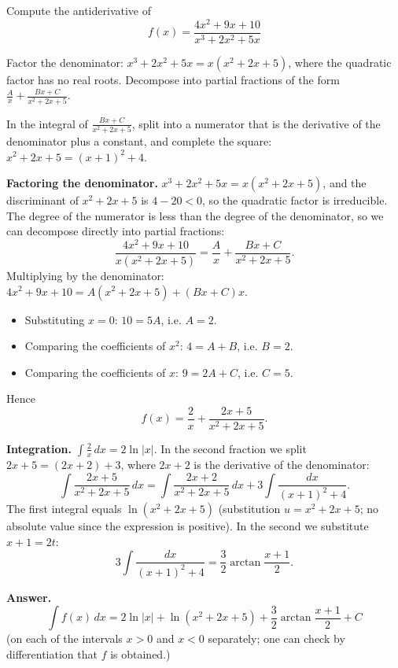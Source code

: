 
\begin{question}
Compute the antiderivative of
\[ f(x)=\frac{4x^2+9x+10}{x^3+2x^2+5x} \]
\end{question}

\begin{hint}
Factor the denominator: $x^3+2x^2+5x=x(x^2+2x+5)$, where the quadratic factor has no real roots. Decompose into partial fractions of the form $\frac{A}{x}+\frac{Bx+C}{x^2+2x+5}$.
\end{hint}

\begin{hint}
In the integral of $\frac{Bx+C}{x^2+2x+5}$, split into a numerator that is the derivative of the denominator plus a constant, and complete the square: $x^2+2x+5=(x+1)^2+4$.
\end{hint}

\begin{solution}
\textbf{Factoring the denominator.} $x^3+2x^2+5x=x(x^2+2x+5)$, and the discriminant of $x^2+2x+5$ is $4-20<0$, so the quadratic factor is irreducible. The degree of the numerator is less than the degree of the denominator, so we can decompose directly into partial fractions:
\[ \frac{4x^2+9x+10}{x(x^2+2x+5)}=\frac{A}{x}+\frac{Bx+C}{x^2+2x+5}. \]
Multiplying by the denominator: $4x^2+9x+10=A(x^2+2x+5)+(Bx+C)x$.
\begin{itemize}
  \item Substituting $x=0$: $10=5A$, i.e. $A=2$.
  \item Comparing the coefficients of $x^2$: $4=A+B$, i.e. $B=2$.
  \item Comparing the coefficients of $x$: $9=2A+C$, i.e. $C=5$.
\end{itemize}
Hence
\[ f(x)=\frac{2}{x}+\frac{2x+5}{x^2+2x+5}. \]

\textbf{Integration.} $\int\frac{2}{x}\,dx=2\ln|x|$. In the second fraction we split $2x+5=(2x+2)+3$, where $2x+2$ is the derivative of the denominator:
\[ \int\frac{2x+5}{x^2+2x+5}\,dx=\int\frac{2x+2}{x^2+2x+5}\,dx+3\int\frac{dx}{(x+1)^2+4}. \]
The first integral equals $\ln(x^2+2x+5)$ (substitution $u=x^2+2x+5$; no absolute value since the expression is positive). In the second we substitute $x+1=2t$:
\[ 3\int\frac{dx}{(x+1)^2+4}=\frac32\arctan\frac{x+1}{2}. \]

\textbf{Answer.}
\[ \boxed{\int f(x)\,dx = 2\ln|x|+\ln(x^2+2x+5)+\frac32\arctan\frac{x+1}{2}+C} \]
(on each of the intervals $x>0$ and $x<0$ separately; one can check by differentiation that $f$ is obtained.)
\end{solution}
